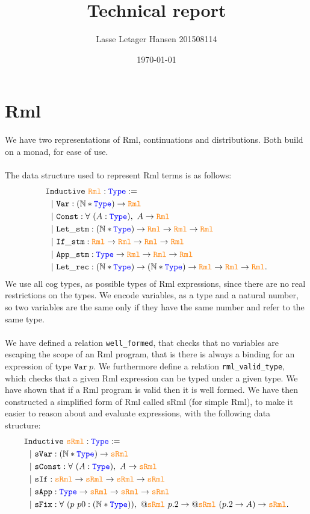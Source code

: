 \documentclass[11pt, leqno]{article}
\author{Lasse Letager Hansen 201508114}
\date{\today}
\title{Technical report}
\newcommand{\Rml}{\textcolor{orange}{\mathtt{Rml}}}
\newcommand{\sRml}{\textcolor{orange}{\mathtt{sRml}}}
\newcommand{\Type}{\textcolor{blue}{\mathtt{Type}}}
\newcommand{\wellformed}{\texttt{well\_formed}}
\newcommand{\valid}{\texttt{rml\_valid\_type}}
\begin{document}
\maketitle

\section{Rml}
We have two representations of Rml, continuations and distributions. Both build on a monad, for ease of use.
\\ \\
The data structure used to represent Rml terms is as follows:
\begin{align*}
  &\mathtt{Inductive}~\Rml : \Type := \\
  &~~|~ \mathtt{Var} : (\mathbb{N} * \Type) \rightarrow \Rml \\
  &~~|~ \mathtt{Const} : \forall~(A : \Type),~A \rightarrow \Rml \\
  &~~|~ \mathtt{Let\_stm} : (\mathbb{N} * \Type) \rightarrow \Rml \rightarrow \Rml \rightarrow \Rml \\
  &~~|~ \mathtt{If\_stm} : \Rml \rightarrow \Rml \rightarrow \Rml \rightarrow \Rml \\
  &~~|~ \mathtt{App\_stm} : \Type \rightarrow \Rml \rightarrow \Rml \rightarrow \Rml \\
  &~~|~ \mathtt{Let\_rec} : (\mathbb{N} * \Type) \rightarrow (\mathbb{N} * \Type) \rightarrow \Rml \rightarrow \Rml \rightarrow \Rml.
\end{align*}
We use all cog types, as possible types of Rml expressions, since there are no real restrictions on the types. We encode variables, as a type and a natural number, so two variables are the same only if they have the same number and refer to the same type.
\\ \\
We have defined a relation \wellformed, that checks that no variables are escaping the scope of an Rml program, that is there is always a binding for an expression of type \(\mathtt{Var}~p\). We furthermore define a relation \valid, which checks that a given Rml expression can be typed under a given type. We have shown that if a Rml program is valid then it is well formed. We have then constructed a simplified form of Rml called sRml (for simple Rml), to make it easier to reason about and evaluate expressions, with the following data structure:
\begin{align*}
  &\mathtt{Inductive}~\sRml : \Type := \\
  &~~|~ \mathtt{sVar} : (\mathbb{N} * \Type) \rightarrow \sRml \\
  &~~|~ \mathtt{sConst} : \forall~(A : \Type),~A \rightarrow \sRml \\
  &~~|~ \mathtt{sIf} : \sRml \rightarrow \sRml \rightarrow \sRml \rightarrow \sRml \\
  &~~|~ \mathtt{sApp} : \Type \rightarrow \sRml \rightarrow \sRml \rightarrow \sRml \\
  &~~|~ \mathtt{sFix} : \forall~(p~p0 : (\mathbb{N} * \Type)),~@\sRml~p.2 \rightarrow @\sRml~(p.2 \rightarrow A) \rightarrow \sRml.
\end{align*}
\end{document}

